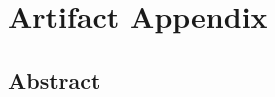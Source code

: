 \documentclass[sigconf]{acmart}
\begin{document}
	
	
	
	
	
	\appendix
	
	\section{Artifact Appendix}
	
%	
	
	
	\subsection{Abstract}
	
\end{document}
